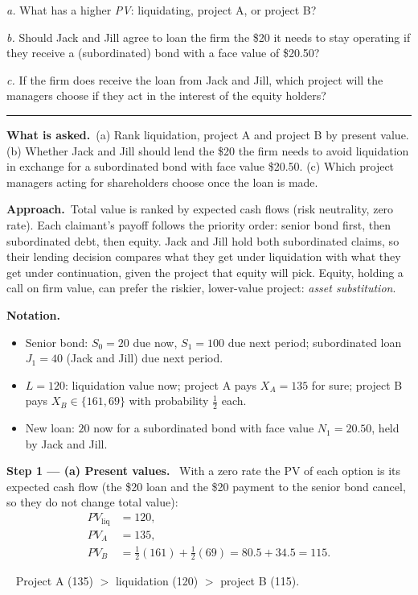 \documentclass[11pt,a4paper]{article}
\newcommand{\notation}{\par\noindent\textbf{Notation.}}
\newcommand{\step}[2]{\par\medskip\noindent\textbf{Step #1 --- #2.}~}
\newcommand{\asked}{\par\medskip\noindent\textbf{What is asked.}~}
\newcommand{\approach}{\par\smallskip\noindent\textbf{Approach.}~}
\newcommand{\answer}[1]{\par\smallskip\noindent\fbox{\textbf{Answer #1.}}~}
\newcommand{\stmtend}{\par\endgroup\nopagebreak\noindent\rule{\linewidth}{0.4pt}\par\medskip}
\begin{document}
\emph{a.} What has a higher \emph{PV}: liquidating, project A, or project B?

\emph{b.} Should Jack and Jill agree to loan the firm the \$20 it needs to stay operating if they
receive a (subordinated) bond with a face value of \$20.50?

\emph{c.} If the firm does receive the loan from Jack and Jill, which project will the managers
choose if they act in the interest of the equity holders?
\stmtend

\asked (a) Rank liquidation, project A and project B by present value. (b) Whether Jack and Jill should lend the \$20 the firm needs to avoid liquidation in exchange for a subordinated bond with face value \$20.50. (c) Which project managers acting for shareholders choose once the loan is made.

\approach Total value is ranked by expected cash flows (risk neutrality, zero rate). Each claimant's payoff follows the priority order: senior bond first, then subordinated debt, then equity. Jack and Jill hold both subordinated claims, so their lending decision compares what they get under liquidation with what they get under continuation, given the project that equity will pick. Equity, holding a call on firm value, can prefer the riskier, lower-value project: \emph{asset substitution}.

\notation
\begin{itemize}
  \item Senior bond: $S_0=20$ due now, $S_1=100$ due next period; subordinated loan $J_1=40$ (Jack and Jill) due next period.
  \item $L=120$: liquidation value now; project A pays $X_A=135$ for sure; project B pays $X_B\in\{161,69\}$ with probability $\tfrac12$ each.
  \item New loan: $20$ now for a subordinated bond with face value $N_1=20.50$, held by Jack and Jill.
\end{itemize}

\step{1}{(a) Present values} With a zero rate the PV of each option is its expected cash flow (the \$20 loan and the \$20 payment to the senior bond cancel, so they do not change total value):
\begin{align}
  PV_{\text{liq}} &= 120, \nonumber\\
  PV_A &= 135, \nonumber\\
  PV_B &= \tfrac12(161)+\tfrac12(69) = 80.5+34.5 = 115. \nonumber
\end{align}
\answer{(a)} Project A (135) $>$ liquidation (120) $>$ project B (115).
\end{document}
